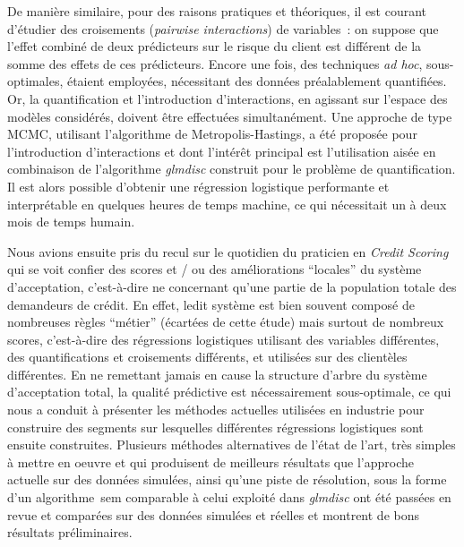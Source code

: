 \medskip

De manière similaire, pour des raisons pratiques et théoriques, il est courant d'étudier des croisements (\textit{pairwise interactions}) de variables~: on suppose que l'effet combiné de deux prédicteurs sur le risque du client est différent de la somme des effets de ces prédicteurs. Encore une fois, des techniques \textit{ad hoc}, sous-optimales, étaient employées, nécessitant des données préalablement quantifiées. Or, la quantification et l'introduction d'interactions, en agissant sur l'espace des modèles considérés, doivent être effectuées simultanément. Une approche de type MCMC, utilisant l'algorithme de Metropolis-Hastings, a été proposée pour l'introduction d'interactions et dont l'intérêt principal est l'utilisation aisée en combinaison de l'algorithme \textit{glmdisc} construit pour le problème de quantification. Il est alors possible d'obtenir une régression logistique performante et interprétable en quelques heures de temps machine, ce qui nécessitait un à deux mois de temps humain.

\medskip

Nous avions ensuite pris du recul sur le quotidien du praticien en \textit{Credit Scoring} qui se voit confier des scores et / ou des améliorations ``locales'' du système d'acceptation, c'est-à-dire ne concernant qu'une partie de la population totale des demandeurs de crédit. En effet, ledit système est bien souvent composé de nombreuses règles ``métier'' (écartées de cette étude) mais surtout de nombreux scores, c'est-à-dire des régressions logistiques utilisant des variables différentes, des quantifications et croisements différents, et utilisées sur des clientèles différentes. En ne remettant jamais en cause la structure d'arbre du système d'acceptation total, la qualité prédictive est nécessairement sous-optimale, ce qui nous a conduit à présenter les méthodes actuelles utilisées en industrie pour construire des segments sur lesquelles différentes régressions logistiques sont ensuite construites. Plusieurs méthodes alternatives de l'état de l'art, très simples à mettre en oeuvre et qui produisent de meilleurs résultats que l'approche actuelle sur des données simulées, ainsi qu'une piste de résolution, sous la forme d'un algorithme~\gls{sem} comparable à celui exploité dans \textit{glmdisc} ont été passées en revue et comparées sur des données simulées et réelles et montrent de bons résultats préliminaires.

